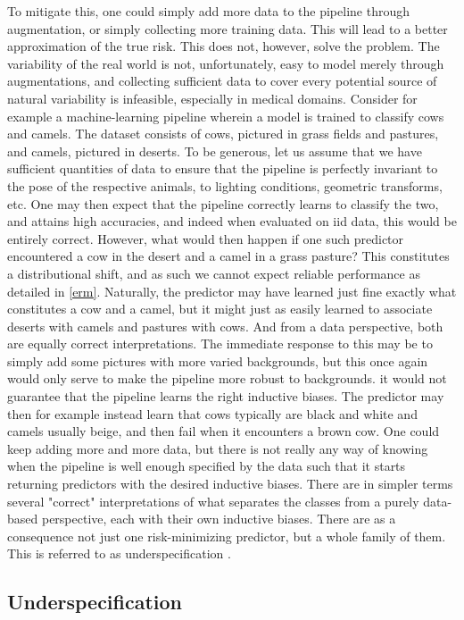 	To mitigate this, one could simply add more data to the pipeline through augmentation, or simply collecting more training data. This will lead to a better approximation of the true risk. This does not, however, solve the problem. The variability of the real world is not, unfortunately, easy to model merely through augmentations, and collecting sufficient data to cover every potential source of natural variability is infeasible, especially in medical domains. 
	Consider for example a machine-learning pipeline wherein a model is trained to classify cows and camels. The dataset consists of cows, pictured in grass fields and pastures, and camels, pictured in deserts. To be generous, let us assume that we have sufficient quantities of data to ensure that the pipeline is perfectly invariant to the pose of the respective animals, to lighting conditions, geometric transforms, etc. One may then expect that the pipeline correctly learns to classify the two, and attains high accuracies, and indeed when evaluated on iid data, this would be entirely correct. However, what would then happen if one such predictor encountered a cow in the desert and a camel in a grass pasture? This constitutes a distributional shift, and as such we cannot expect reliable performance as detailed in \ref{erm}. Naturally, the predictor may have learned just fine exactly what constitutes a cow and a camel, but it might just as easily learned to associate deserts with camels and pastures with cows. And from a data perspective, both are equally correct interpretations. The immediate response to this may be to simply add some pictures with more varied backgrounds, but this once again would only serve to make the pipeline more robust to backgrounds. it would not guarantee that the pipeline learns the right inductive biases. The predictor may then for example instead learn that cows typically are black and white and camels usually beige, and then fail when it encounters a brown cow. One could keep adding more and more data, but there is not really any way of knowing when the pipeline is well enough specified by the data such that it starts returning predictors with the desired inductive biases. There are in simpler terms several "correct" interpretations of what separates the classes from a purely data-based perspective, each with their own inductive biases. There are as a consequence not just one risk-minimizing predictor, but a whole family of them. This is referred to as underspecification \cite{damour2020underspecification}.
\subsection{Underspecification}

